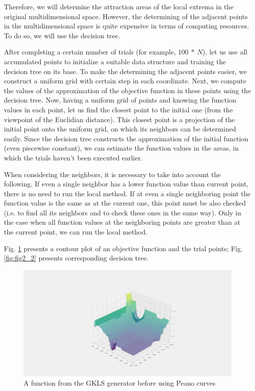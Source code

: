 \documentclass{svproc}
\begin{document}
Therefore, we will determine the attraction areas of the local extrema in the original multidimensional space. However, the determining of the adjacent points in the multidimensional space is quite expensive in terms of computing resources. To do so, we will use the decision tree. 

After completing a certain number of trials (for example, $100\ \ast\ N$), let us use all accumulated  points to initialize a suitable data structure and training the decision tree on its base. To make the  determining the adjacent points easier, we construct a uniform grid with certain step in each coordinate.  Next, we compute the values of the approximation of the objective function in these points  using the decision tree. Now, having a uniform grid of points and knowing the function values in each  point, let us find the closest point to the initial one (from the viewpoint of the Euclidian distance). This  closest point is a projection of the initial point onto the uniform grid, on which its neighbors can be  determined easily. Since the decision tree constructs the approximation of the initial function (even  piecewise constant), we can estimate the function values in the areas, in which the trials haven't been  executed earlier.

When considering the neighbors, it is necessary to take into account the following. If even a single  neighbor has a lower function value than current point, there is no need to run the local method. If at  even a single neighboring point the function value is the same as at the current one, this point must be also checked (i.e. to find all its neighbors and to check these ones in the same way). Only in the case when  all function values at the neighboring points are greater than at the current point, we can run the local  method.

Fig. \ref{fig:fig2} presents a contour plot of an objective function and the trial points; Fig.  \ref{fig:fig2_2} presents corresponding decision tree. 


\begin{figure}[ht!]
	\begin{center}
		\begin{minipage}[h]{0.9\linewidth}
			\includegraphics[width=1\linewidth]{figure/fig4.png}
			\caption{A function from the GKLS generator before using Peano curves} %
			\label{fig:fig2}
		\end{minipage}
	\end{center}
\end{figure}	
\end{document}
